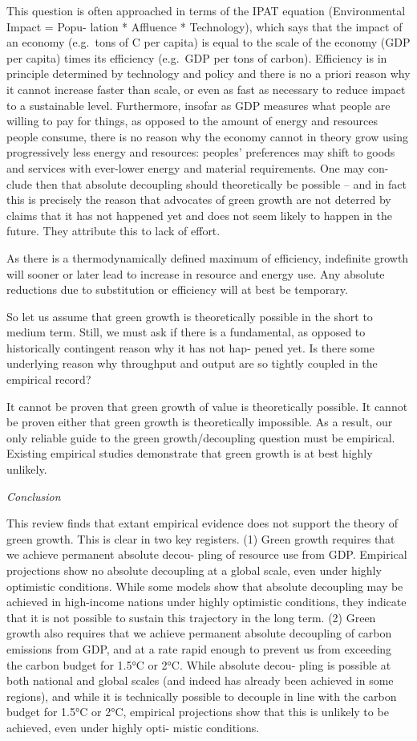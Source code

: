 \documentclass[
]{book}
\begin{document}
This question is often approached in terms of the IPAT equation (Environmental Impact = Popu-
lation * Affluence * Technology), which says that the impact of an economy (e.g.~tons of C per
capita) is equal to the scale of the economy (GDP per capita) times its efficiency (e.g.~GDP per tons
of carbon). Efficiency is in principle determined by technology and policy and there is no a priori
reason why it cannot increase faster than scale, or even as fast as necessary to reduce impact to a
sustainable level. Furthermore, insofar as GDP measures what people are willing to pay for things,
as opposed to the amount of energy and resources people consume, there is no reason why the
economy cannot in theory grow using progressively less energy and resources: peoples' preferences
may shift to goods and services with ever-lower energy and material requirements. One may con-
clude then that absolute decoupling should theoretically be possible -- and in fact this is precisely
the reason that advocates of green growth are not deterred by claims that it has not happened
yet and does not seem likely to happen in the future. They attribute this to lack of effort.

As there is a thermodynamically defined maximum of efficiency, indefinite growth will sooner or later
lead to increase in resource and energy use. Any absolute reductions due to substitution or efficiency
will at best be temporary.

So let us assume that green growth is theoretically possible in the short to medium term. Still, we
must ask if there is a fundamental, as opposed to historically contingent reason why it has not hap-
pened yet. Is there some underlying reason why throughput and output are so tightly coupled in the
empirical record?

It cannot be proven that green growth of value is theoretically possible.
It cannot be proven either that green growth is theoretically impossible.
As a result, our only reliable guide to the green growth/decoupling question
must be empirical.
Existing empirical studies demonstrate that green growth is at best highly unlikely.

\emph{Conclusion}

This review finds that extant empirical evidence does not support the theory of green growth. This
is clear in two key registers. (1) Green growth requires that we achieve permanent absolute decou-
pling of resource use from GDP. Empirical projections show no absolute decoupling at a global
scale, even under highly optimistic conditions. While some models show that absolute decoupling
may be achieved in high-income nations under highly optimistic conditions, they indicate that it is
not possible to sustain this trajectory in the long term. (2) Green growth also requires that we
achieve permanent absolute decoupling of carbon emissions from GDP, and at a rate rapid
enough to prevent us from exceeding the carbon budget for 1.5°C or 2°C. While absolute decou-
pling is possible at both national and global scales (and indeed has already been achieved in
some regions), and while it is technically possible to decouple in line with the carbon budget for
1.5°C or 2°C, empirical projections show that this is unlikely to be achieved, even under highly opti-
mistic conditions.
\end{document}
